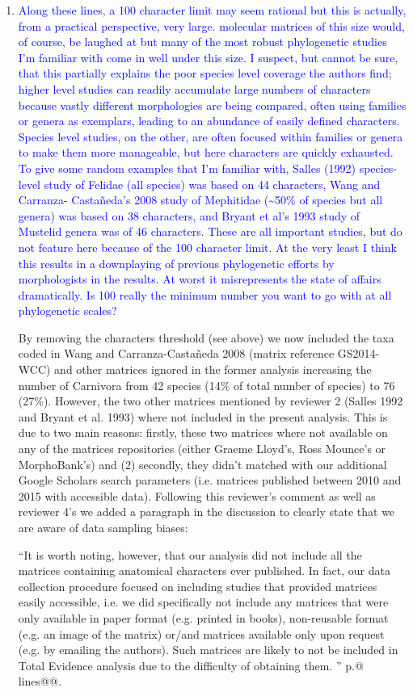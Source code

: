 \documentclass[12pt,letterpaper]{article}
\begin{document}
\begin{enumerate}
\item{\textcolor{blue}{Along these lines, a 100 character limit may seem rational but this is actually, from a practical perspective, very large. molecular matrices of this size would, of course, be laughed at but many of the most robust phylogenetic studies I'm familiar with come in well under this size. I suspect, but cannot be sure, that this partially explains the poor species level coverage the authors find; higher level studies can readily accumulate large numbers of characters because vastly different morphologies are being compared, often using families or genera as exemplars, leading to an abundance of easily defined characters. Species level studies, on the other, are often focused within families or genera to make them more manageable, but here characters are quickly exhausted. To give some random examples that I'm familiar with, Salles (1992) species-level study of Felidae (all species) was based on 44 characters, Wang and Carranza- Casta\~{n}eda's 2008 study of Mephitidae (\textasciitilde50\% of species but all genera) was based on 38 characters, and Bryant et al's 1993 study of Mustelid genera was of 46 characters. These are all important studies, but do not feature here because of the 100 character limit. At the very least I think this results in a downplaying of previous phylogenetic efforts by morphologists in the results. At worst it misrepresents the state of affairs dramatically. Is 100 really the minimum number you want to go with at all phylogenetic scales?}}

By removing the characters threshold (see above) we now included the taxa coded in Wang and Carranza-Casta\~{n}eda 2008 (matrix reference GS2014-WCC) and other matrices ignored in the former analysis increasing the number of Carnivora from 42 species (14\% of total number of species) to 76 (27\%).
However, the two other matrices mentioned by reviewer 2 (Salles 1992 and Bryant et al. 1993) where not included in the present analysis.
This is due to two main reasons: firstly, these two matrices where not available on any of the matrices repositories (either Graeme Lloyd's, Ross Mounce's or MorphoBank's) and (2) secondly, they didn't matched with our additional Google Scholars search parameters (i.e. matrices published between 2010 and 2015 with accessible data).
Following this reviewer's comment as well as reviewer 4's we added a paragraph in the discussion to clearly state that we are aware of data sampling biases:

``It is worth noting, however, that our analysis did not include all the matrices containing anatomical characters ever published.
In fact, our data collection procedure focused on including studies that provided matrices easily accessible, i.e. we did specifically not include any matrices that were only available in paper format (e.g. printed in books), non-reusable format (e.g. an image of the matrix) %
or/and matrices available only upon request (e.g. by emailing the authors).
Such matrices are likely to not be included in Total Evidence analysis due to the difficulty of obtaining them.
'' p.@ lines@@.



\end{enumerate}
\end{document}

